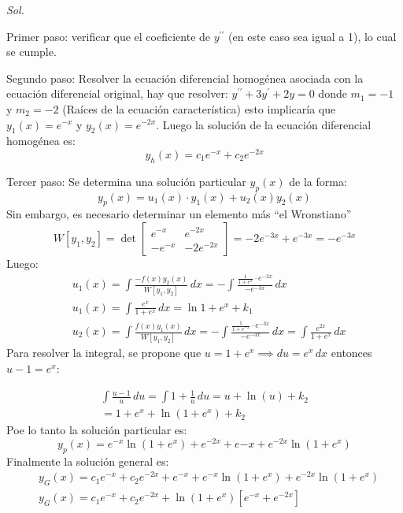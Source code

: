 \textit{ Sol. }

Primer paso: verificar que el coeficiente de $y^{\prime\prime}$ (en este caso sea igual a 1), lo cual se cumple.

Segundo paso: Resolver la ecuación diferencial homogénea asociada con la ecuación diferencial original, hay que resolver: $y^{\prime\prime}+3y^{\prime}+2y=0$
donde $m_1=-1$ y $m_2=-2$ (Raíces de la ecuación característica) esto implicaría que $y_1(x)=e^{-x}$ y $y_2(x)=e^{-2x}$. Luego la solución de la ecuación diferencial homogénea es:
\begin{equation*}
    y_h(x)= c_1e^{- x}+c_2e^{-2x}
\end{equation*}

Tercer paso: Se determina una solución particular $y_p(x)$ de la forma:
\begin{equation*}
    y_p(x) = u_1(x)\cdot y_1(x)+ u_2(x) y_2(x)
\end{equation*}
Sin embargo, es necesario determinar un elemento más ``el Wronstiano''
\begin{equation*}
    W\left[y_1,y_2\right] = \det\begin{bmatrix}
        e^{ -x} & e^{ -2x}\\
        -e^{-x}&- 2e^{ -2x}
    \end{bmatrix} =-2e^{ -3x}+e^{ -3x}=-e^{ -3x}
\end{equation*}
Luego:
\begin{align*}
    &u_1(x)=\int \frac{-f(x)y_2(x)}{W\left[y_1,y_2\right]}\,dx=-\int\frac{\frac{1}{1 +e^x}\cdot e^{-2x}}{-e^{- 3x}}\,dx\\
    &u_1(x)=\int \frac{e^x}{1 +e^x}\,dx= \ln{1+ e^x}+ k_1\\
    &u_2(x)=\int \frac{f(x)y_1(x)}{W\left[y_1,y_2\right]}\,dx=-\int\frac{\frac{1}{1 +e^{ -x}}\cdot e^{ -3x}}{-e^{- 3x}}\,dx =\int\frac{e^{2x}}{1+ e^x}\,dx
\end{align*}
Para resolver la integral, se propone que $u=1+e^x\implies du=e^x\,dx$ entonces $u-1=e^x$: 

\begin{align*}
    \int\frac{u -1}{u}\,du = \int 1 + \frac{1}{u}\,du = u+\ln{(u)}+ k_2\\
    = 1+ e^x+\ln{(1+ e^x)} +k_2
\end{align*}
Poe lo tanto la solución particular es:
\begin{equation*}
    y_p(x) = e^{-x}\ln{(1+e^x)}+e^{-2x}+e{-x}+ e^{-2x}\ln{(1+ e^x)}
\end{equation*}
Finalmente la solución general es:
\begin{align*}
    &y_G(x)= c_1e^{-x}+c_2e^{-2x}+e^{-x}+e^{-x}\ln{(1+e^{x})}+e^{- 2x}\ln{(1+e^x)}\\
    &y_G(x)= c_1e^{-x}+c_2e^{-2x} +\ln{(1+e^{x})}\left[e^{- x}+e^{-2x}\right]
\end{align*}

